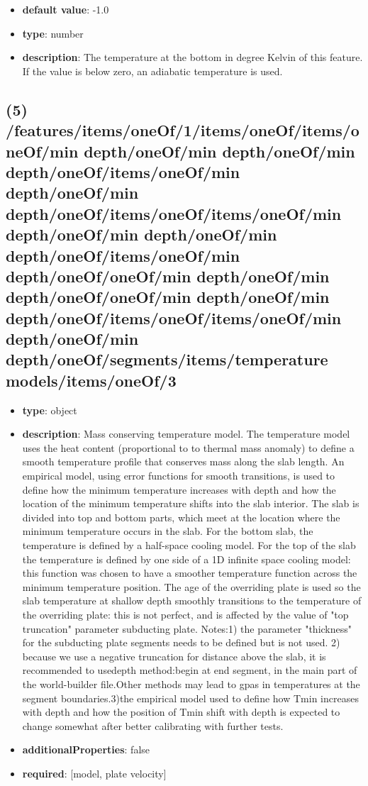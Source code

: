 \begin{itemize}[leftmargin=6em]\item {\bf default value}: -1.0
\item {\bf type}: number
\item {\bf description}: The temperature at the bottom in degree Kelvin of this feature. If the value is below zero, an adiabatic temperature is used.
\end{itemize}\subsection{(5) /features/items/oneOf/1/items/oneOf/items/oneOf/min depth/oneOf/min depth/oneOf/min depth/oneOf/items/oneOf/min depth/oneOf/min depth/oneOf/items/oneOf/items/oneOf/min depth/oneOf/min depth/oneOf/min depth/oneOf/items/oneOf/min depth/oneOf/oneOf/min depth/oneOf/min depth/oneOf/oneOf/min depth/oneOf/min depth/oneOf/items/oneOf/items/oneOf/min depth/oneOf/min depth/oneOf/segments/items/temperature models/items/oneOf/3}
\begin{itemize}[leftmargin=5em]\item {\bf type}: object
\item {\bf description}: Mass conserving temperature model. The temperature model uses the heat content (proportional to to thermal mass anomaly) to define a smooth temperature profile that conserves mass along the slab length. An empirical model, using error functions for smooth transitions, is used to  define how the minimum temperature increases with depth and how the location of the minimum temperature shifts into the slab interior. The slab is divided into top and bottom parts, which meet at the location where the minimum temperature occurs in the slab. For the bottom slab, the temperature is defined by a half-space cooling model. For the top of the slab the temperature is defined by one side of a 1D infinite space cooling model: this function was chosen to have a smoother temperature function across the minimum temperature position. The age of the overriding plate is used so the slab temperature at shallow depth smoothly transitions to the temperature of the overriding plate: this is not perfect, and is affected by the value of "top truncation" parameter subducting plate. Notes:1) the parameter "thickness" for the subducting plate segments needs to be defined but is not used. 2) because we use a negative truncation for distance above the slab, it is recommended to usedepth method:begin at end segment, in the main part of the world-builder file.Other methods may lead to gpas in temperatures at the segment boundaries.3)the empirical model used to define how Tmin increases with depth and how the position of Tmin shift with depth is expected to change somewhat after better calibrating with further tests.
\item {\bf additionalProperties}: false
\item {\bf required}: [model, plate velocity]\end{itemize}
